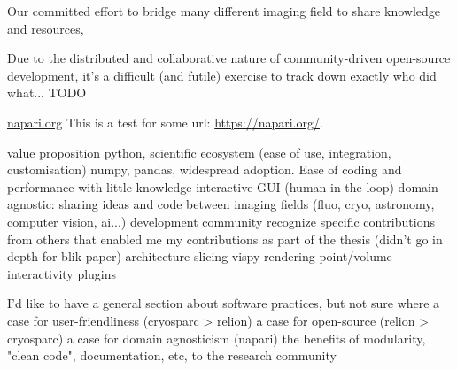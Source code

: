 Our committed effort to bridge many different imaging field to share knowledge and resources, 

Due to the distributed and collaborative nature of community-driven open-source development, it's a difficult (and futile) exercise to track down exactly who did what... TODO

\href{https://napari.org/}{napari.org}
This is a test for some url: \url{https://napari.org/}.

\begin{outline}
\1 value proposition
    \2 python, scientific ecosystem (ease of use, integration, customisation)
    \2 numpy, pandas, widespread adoption. Ease of coding and performance with little knowledge
    \2 interactive GUI (human-in-the-loop)
    \2 domain-agnostic: sharing ideas and code between imaging fields (fluo, cryo, astronomy, computer vision, ai...)
\1 development
    \2 community
        \3 recognize specific contributions from others that enabled me
    \2 my contributions as part of the thesis (didn't go in depth for blik paper)
        \3 architecture
        \3 slicing
        \3 vispy rendering
        \3 point/volume interactivity
        \3 plugins

\1 I'd like to have a general section about software practices, but not sure where
    \2 a case for user-friendliness (cryosparc > relion)
    \2 a case for open-source (relion > cryosparc)
    \2 a case for domain agnosticism (napari)
    \2 the benefits of modularity, "clean code", documentation, etc, to the research community
\end{outline}

